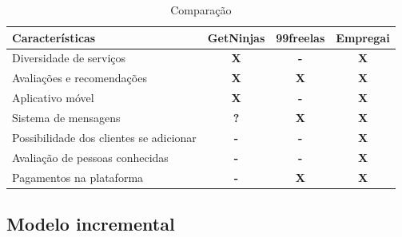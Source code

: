 \begin{table}[htb]
    \centering
    \caption{Comparação}
    \label{tab:comparação}
\begin{tabular}{|p{5cm}|p{2cm}|p{2cm}|p{2cm}|}
    \hline
    \textbf{Características} & \textbf{GetNinjas} & \textbf{99freelas} & \textbf{Empregai}  \\ \hline
    Diversidade de serviços   & \multicolumn{1}{c|}{\textbf{X}}   & \multicolumn{1}{c|}{\textbf{-}}  & \multicolumn{1}{c|}{\textbf{X}} \\ \hline
	Avaliações e recomendações   & \multicolumn{1}{c|}{\textbf{X}}   & \multicolumn{1}{c|}{\textbf{X}}  & \multicolumn{1}{c|}{\textbf{X}} \\ \hline
    Aplicativo móvel   & \multicolumn{1}{c|}{\textbf{X}}   & \multicolumn{1}{c|}{\textbf{-}}  & \multicolumn{1}{c|}{\textbf{X}} \\ \hline
    Sistema de mensagens   & \multicolumn{1}{c|}{\textbf{?}}   & \multicolumn{1}{c|}{\textbf{X}}  & \multicolumn{1}{c|}{\textbf{X }} \\ \hline
    Possibilidade dos clientes se adicionar   & \multicolumn{1}{c|}{\textbf{-}}   & \multicolumn{1}{c|}{\textbf{-}}  & \multicolumn{1}{c|}{\textbf{X}} \\ \hline
	Avaliação de pessoas conhecidas   & \multicolumn{1}{c|}{\textbf{-}}   & \multicolumn{1}{c|}{\textbf{-}}  & \multicolumn{1}{c|}{\textbf{X}} \\ \hline
	Pagamentos na plataforma   & \multicolumn{1}{c|}{\textbf{-}}   & \multicolumn{1}{c|}{\textbf{X}}  & \multicolumn{1}{c|}{\textbf{X}} \\ \hline
\end{tabular}
\end{table}

\subsection{Modelo incremental}

